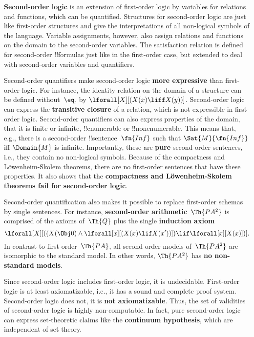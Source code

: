 \textbf{Second-order logic} is an extension of first-order logic by
variables for relations and functions, which can be
quantified. Structures for second-order logic are just like
first-order structures and give the interpretations of all non-logical
symbols of the language.  Variable assignments, however, also assign
relations and functions on the domain to the second-order
variables. The satisfaction relation is defined for second-order
!!{formula}s just like in the first-order case, but extended to deal
with second-order variables and quantifiers.

Second-order quantifiers make second-order logic \textbf{more
  expressive} than first-order logic.  For instance, the identity
relation on the domain of a structure can be defined without~$\eq$, by
$\lforall[X][(X(x) \liff X(y))]$. Second-order logic can express the
\textbf{transitive closure} of a relation, which is not expressible in
first-order logic.  Second-order quantifiers can also express
properties of the domain, that it is finite or infinite,
!!{enumerable} or !!{nonenumerable}. This means that, e.g., there is a
second-order !!{sentence}~$\fn{Inf}$ such that $\Sat{M}{\fn{Inf}}$ iff
$\Domain{M}$ is infinite. Importantly, these are \textbf{pure}
second-order sentences, i.e., they contain no non-logical
symbols. Because of the compactness and L\"owenheim-Skolem theorems,
there are no first-order sentences that have these properties.  It
also shows that the \textbf{compactness and L\"owenheim-Skolem
  theorems fail for second-order logic}.

Second-order quantification also makes it possible to replace
first-order schemas by single sentences. For instance,
\textbf{second-order arithmetic}~$\Th{PA^2}$ is comprised of the
axioms of~$\Th{Q}$ plus the single \textbf{induction axiom}
\[
\lforall[X][((X(\Obj 0) \land \lforall[x][(X(x) \lif X(x'))]) \lif
  \lforall[x][X(x)])].
\]
In contrast to first-order~$\Th{PA}$, all second-order models
of~$\Th{PA^2}$ are isomorphic to the standard model. In other words,
$\Th{PA^2}$ has \textbf{no non-standard models}. 

Since second-order logic includes first-order logic, it is
undecidable. First-order logic is at least axiomatizable, i.e., it has
a sound and complete proof system. Second-order logic does not, it is
\textbf{not axiomatizable}. Thus, the set of validities of
second-order logic is highly non-computable. In fact, pure second-order
logic can express set-theoretic claims like the \textbf{continuum
  hypothesis}, which are independent of set theory.
